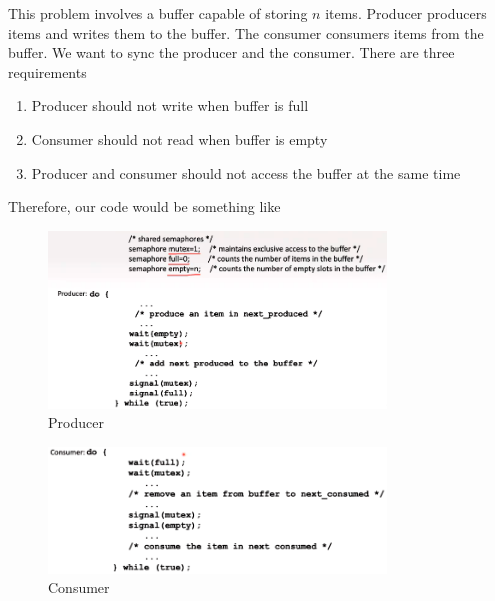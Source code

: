 \documentclass[a4paper]{article}
\theoremstyle{plain}
\theoremstyle{definition}
\newtheorem{defn}{Definition}[section]
\theoremstyle{remark}
\begin{document}
\begin{tcolorbox}[colback=black!3!white,colframe=black!60!white,title=\begin{defn}Bounded Buffer Problem \label{Bounded Buffer Problem}\end{defn}]
This problem involves a buffer capable of storing $n$ items. Producer producers items and writes them to the buffer. The consumer consumers items from the buffer. We want to sync the producer and the consumer. There are three requirements
\begin{enumerate}
	\item Producer should not write when buffer is full
	\item Consumer should not read when buffer is empty
	\item Producer and consumer should not access the buffer at the same time
\end{enumerate}
Therefore, our code would be something like
\begin{figure}[H]
	\centering
	\includegraphics[width=0.8\textwidth]{fifty.png}
	\caption{Producer}
	\label{fig:fifty-png}
\end{figure}
\begin{figure}[H]
	\centering
	\includegraphics[width=0.8\textwidth]{fiftyone.png}
	\caption{Consumer}
	\label{fig:fiftyone-png}
\end{figure}
\end{tcolorbox}
\end{document}
